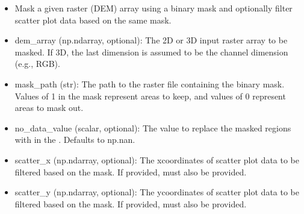 \documentclass[letterpaper,10pt,english]{sphinxmanual}
\begin{document}

\begin{fulllineitems}
\label{\detokenize{akhdefo_functions:akhdefo_functions.Akhdefo_GOI.mask_raster}}
\pysigstartsignatures
{}
\pysigstopsignatures\begin{description}
\begin{itemize}
\item {} 
\sphinxAtStartPar
Mask a given raster (DEM) array using a binary mask and optionally filter scatter plot data based on the same mask.

\item {} 
\sphinxAtStartPar
dem\_array (np.ndarray, optional): The 2D or 3D input raster array to be masked. If 3D, the last dimension is assumed to be the channel dimension (e.g., RGB).

\item {} 
\sphinxAtStartPar
mask\_path (str): The path to the raster file containing the binary mask. Values of 1 in the mask represent areas to keep, and values of 0 represent areas to mask out.

\item {} 
\sphinxAtStartPar
no\_data\_value (scalar, optional): The value to replace the masked regions with in the . Defaults to np.nan.

\item {} 
\sphinxAtStartPar
scatter\_x (np.ndarray, optional): The x\sphinxhyphen{}coordinates of scatter plot data to be filtered based on the mask. If provided,  must also be provided.

\item {} 
\sphinxAtStartPar
scatter\_y (np.ndarray, optional): The y\sphinxhyphen{}coordinates of scatter plot data to be filtered based on the mask. If provided,  must also be provided.


\end{itemize}
\end{description}
\end{fulllineitems}
\end{document}
